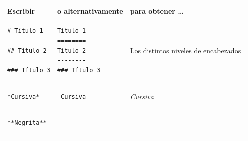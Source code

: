 \documentclass[]{book}
\theoremstyle{definition}
\theoremstyle{definition}
\theoremstyle{definition}
\theoremstyle{remark}
\begin{document}
\begin{longtable}[]{@{}lll@{}}
\toprule
\begin{minipage}[b]{0.29\columnwidth}\raggedright\strut
Escribir\strut
\end{minipage} & \begin{minipage}[b]{0.33\columnwidth}\raggedright\strut
o alternativamente\strut
\end{minipage} & \begin{minipage}[b]{0.29\columnwidth}\raggedright\strut
para obtener \ldots{}\strut
\end{minipage}\tabularnewline
\midrule
\endhead
\begin{minipage}[t]{0.32\columnwidth}\raggedright\strut
\begin{verbatim}
# Título 1
 
## Título 2
 
### Título 3
\end{verbatim}
\strut
\end{minipage} & \begin{minipage}[t]{0.32\columnwidth}\raggedright\strut
\begin{verbatim}
Título 1
========
Título 2
--------
### Título 3
\end{verbatim}
\strut
\end{minipage} & \begin{minipage}[t]{0.32\columnwidth}\raggedright\strut
Los distintos niveles de encabezados\strut
\end{minipage}\tabularnewline
\begin{minipage}[t]{0.32\columnwidth}\raggedright\strut
\begin{verbatim}
*Cursiva*
\end{verbatim}
\strut
\end{minipage} & \begin{minipage}[t]{0.32\columnwidth}\raggedright\strut
\begin{verbatim}
_Cursiva_
\end{verbatim}
\strut
\end{minipage} & \begin{minipage}[t]{0.32\columnwidth}\raggedright\strut
\emph{Cursiva}\strut
\end{minipage}\tabularnewline
\begin{minipage}[t]{0.32\columnwidth}\raggedright\strut
\begin{verbatim}
**Negrita**
\end{verbatim}
\strut
\end{minipage} & \begin{minipage}[t]{0.32\columnwidth}\raggedright\strut

\end{minipage}
\end{longtable}
\end{document}
